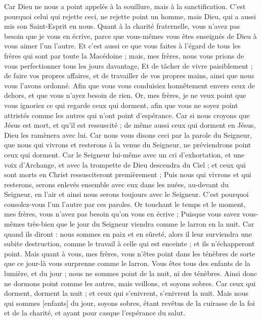 \begin{multicols}{2}
Car Dieu ne nous a point appelés à la souillure, mais à la sanctification.
C'est pourquoi celui qui rejette ceci, ne rejette point un homme, mais Dieu, qui a aussi mis son Saint-Esprit en nous.
Quant à la charité fraternelle, vous n'avez pas besoin que je vous en écrive, parce que vous-mêmes vous êtes enseignés de Dieu à vous aimer l'un l'autre.
Et c'est aussi ce que vous faites à l'égard de tous les frères qui sont par toute la Macédoine ; mais, mes frères, nous vous prions de vous perfectionner tous les jours davantage,
Et de tâcher de vivre paisiblement ; de faire vos propres affaires, et de travailler de vos propres mains, ainsi que nous vous l'avons ordonné.
Afin que vous vous conduisiez honnêtement envers ceux de dehors, et que vous n'ayez besoin de rien.
Or, mes frères, je ne veux point que vous ignoriez ce qui regarde ceux qui dorment, afin que vous ne soyez point attristés comme les autres qui n'ont point d'espérance.
Car si nous croyons que Jésus est mort, et qu'il est ressuscité ; de même aussi ceux qui dorment en Jésus, Dieu les ramènera avec lui.
Car nous vous disons ceci par la parole du Seigneur, que nous qui vivrons et resterons à la venue du Seigneur, ne préviendrons point ceux qui dorment.
Car le Seigneur lui-même avec un cri d'exhortation, et une voix d'Archange, et avec la trompette de Dieu descendra du Ciel ; et ceux qui sont morts en Christ ressusciteront premièrement ;
Puis nous qui vivrons et qui resterons, serons enlevés ensemble avec eux dans les nuées, au-devant du Seigneur, en l'air et ainsi nous serons toujours avec le Seigneur.
C'est pourquoi consolez-vous l'un l'autre par ces paroles.
\VerseOne{}Or touchant le temps et le moment, mes frères, vous n'avez pas besoin qu'on vous en écrive ;
Puisque vous savez vous-mêmes très-bien que le jour du Seigneur viendra comme le larron en la nuit.
Car quand ils diront : nous sommes en paix et en sûreté, alors il leur surviendra une subite destruction, comme le travail à celle qui est enceinte ; et ils n'échapperont point.
Mais quant à vous, mes frères, vous n'êtes point dans les ténèbres de sorte que ce jour-là vous surprenne comme le larron.
Vous êtes tous des enfants de la lumière, et du jour ; nous ne sommes point de la nuit, ni des ténèbres.
Ainsi donc ne dormons point comme les autres, mais veillons, et soyons sobres.
Car ceux qui dorment, dorment la nuit ; et ceux qui s'enivrent, s'enivrent la nuit.
Mais nous qui sommes [enfants] du jour, soyons sobres, étant revêtus de la cuirasse de la foi et de la charité, et ayant pour casque l'espérance du salut.

\end{multicols}
